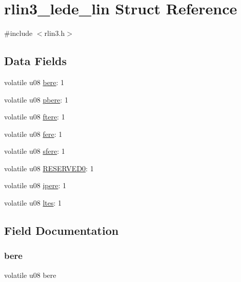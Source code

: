 \hypertarget{structrlin3__lede__lin}{}\section{rlin3\+\_\+lede\+\_\+lin Struct Reference}
\label{structrlin3__lede__lin}


{\ttfamily \#include $<$rlin3.\+h$>$}

\subsection*{Data Fields}
\begin{DoxyCompactItemize}
\item 
volatile u08 \mbox{\hyperlink{structrlin3__lede__lin_a3e2f097885e975d6a1098106f6b5a74a}{bere}}\+: 1
\item 
volatile u08 \mbox{\hyperlink{structrlin3__lede__lin_aaf4b64872b210bd39d07d337fd4d931a}{pbere}}\+: 1
\item 
volatile u08 \mbox{\hyperlink{structrlin3__lede__lin_a851b869f3a90b0f5a4582831614e838c}{ftere}}\+: 1
\item 
volatile u08 \mbox{\hyperlink{structrlin3__lede__lin_ac691420e46bd4b236478f4b47c210a52}{fere}}\+: 1
\item 
volatile u08 \mbox{\hyperlink{structrlin3__lede__lin_ad61759570404801676abb272aadee33f}{sfere}}\+: 1
\item 
volatile u08 \mbox{\hyperlink{structrlin3__lede__lin_a59c0b30ccfb89f1b34e9682741859abd}{R\+E\+S\+E\+R\+V\+E\+D0}}\+: 1
\item 
volatile u08 \mbox{\hyperlink{structrlin3__lede__lin_adb8fda7840dee79dd19f324f2137ed67}{ipere}}\+: 1
\item 
volatile u08 \mbox{\hyperlink{structrlin3__lede__lin_a76b69cea571997fb284140a0df4a0c5a}{ltes}}\+: 1
\end{DoxyCompactItemize}


\subsection{Field Documentation}
\mbox{\label{structrlin3__lede__lin_a3e2f097885e975d6a1098106f6b5a74a}} 
\subsubsection{\texorpdfstring{bere}{bere}}
{\footnotesize\ttfamily volatile u08 bere}

